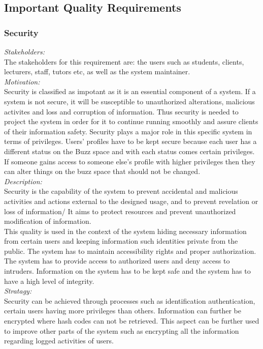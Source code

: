 \documentclass[a4paper,12pt]{report}
\begin{document}
		
	\subsection{Important Quality Requirements}
		\subsubsection{Security}
		\emph{Stakeholders: }\\ The stakeholders for this requirement are: the users such as students, clients, lecturers, staff, tutors etc,  as well as the system maintainer.\\
		
		\emph{Motivation: }\\ Security is classified as impotant as it is an essential component of a system. If a system is not secure, it will be susceptible to unauthorized alterations, malicious activites and loss and corruption of information. Thus security is needed to project the system in order for it to continue running smoothly and assure clients of their information safety. Security plays a major role in this specific system in terms of privileges. Users' profiles have to be kept secure because each user has a different status on the Buzz space and with each status comes certain privileges. If someone gains access to someone else's profile with higher privileges then they can alter things on the buzz space that should not be changed. \\
		
		\emph{Description: }\\ Security is the capability of the system to prevent accidental  and malicious activities and actions external to the designed usage, and to prevent revelation or loss of information/ It aims to protect resources and prevent unauthorized modification of information.\\
		This quality is used in the context of the system hiding necessary information from certain users and keeping information such identities private from the public. The system has to maintain accessibility rights and proper authorization. The system has to provide access to authorized users and deny access to intruders. Information on the system has to be kept safe and the system has to have a high level of integrity.\\
		
		\emph{Stratagy: }\\ Security can be achieved through processes such as identification authentication, certain users having more privileges than others. Information can further be encrypted where hash codes can not be retrieved. This aspect can be further used to improve other parts of the system such as encrypting all the information regarding logged activities of users.\\
		
\end{document}
